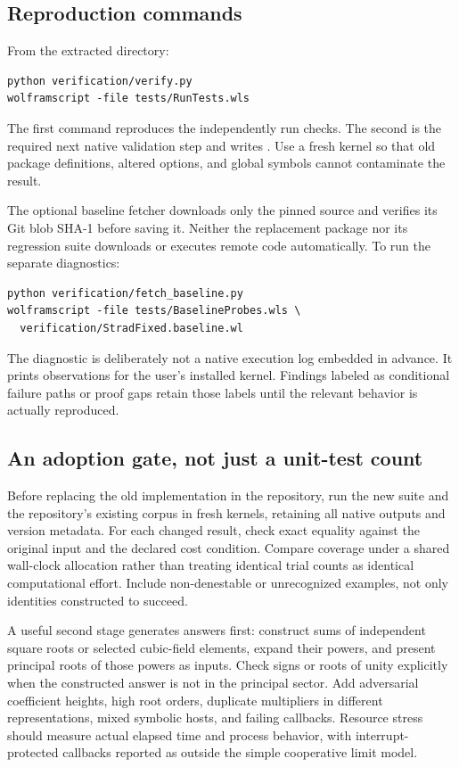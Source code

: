 \documentclass[11pt,letterpaper]{article}
\newcommand{\code}[1]{\texttt{\detokenize{#1}}}
\theoremstyle{definition}
\theoremstyle{remark}
\begin{document}
\subsection{Reproduction commands}

From the extracted directory:
\begin{lstlisting}[language={}]
python verification/verify.py
wolframscript -file tests/RunTests.wls
\end{lstlisting}
The first command reproduces the independently run checks. The second is the required next native validation step and writes \code{tests/native-results.json}. Use a fresh kernel so that old package definitions, altered options, and global symbols cannot contaminate the result.

The optional baseline fetcher downloads only the pinned source and verifies its Git blob SHA-1 before saving it. Neither the replacement package nor its regression suite downloads or executes remote code automatically. To run the separate diagnostics:
\begin{lstlisting}[language={}]
python verification/fetch_baseline.py
wolframscript -file tests/BaselineProbes.wls \
  verification/StradFixed.baseline.wl
\end{lstlisting}
The diagnostic is deliberately not a native execution log embedded in advance. It prints observations for the user's installed kernel. Findings labeled as conditional failure paths or proof gaps retain those labels until the relevant behavior is actually reproduced.

\subsection{An adoption gate, not just a unit-test count}

Before replacing the old implementation in the repository, run the new suite and the repository's existing corpus in fresh kernels, retaining all native outputs and version metadata. For each changed result, check exact equality against the original input and the declared cost condition. Compare coverage under a shared wall-clock allocation rather than treating identical trial counts as identical computational effort. Include non-denestable or unrecognized examples, not only identities constructed to succeed.

A useful second stage generates answers first: construct sums of independent square roots or selected cubic-field elements, expand their powers, and present principal roots of those powers as inputs. Check signs or roots of unity explicitly when the constructed answer is not in the principal sector. Add adversarial coefficient heights, high root orders, duplicate multipliers in different representations, mixed symbolic hosts, and failing callbacks. Resource stress should measure actual elapsed time and process behavior, with interrupt-protected callbacks reported as outside the simple cooperative limit model.
\end{document}
